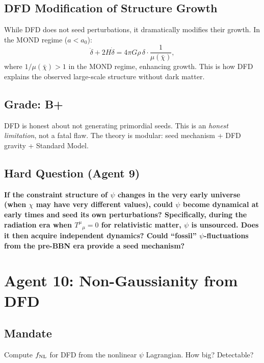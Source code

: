 \documentclass[11pt,a4paper]{article}
\begin{document}
\subsection{DFD Modification of Structure Growth}

While DFD does not seed perturbations, it dramatically modifies their growth. In the MOND regime ($a < a_0$):
\begin{equation}
\ddot\delta + 2H\dot\delta = 4\pi G\rho\,\delta\cdot\frac{1}{\mu(\bar\chi)},
\end{equation}
where $1/\mu(\bar\chi) > 1$ in the MOND regime, enhancing growth. This is how DFD explains the observed large-scale structure without dark matter.

\subsection{Grade: B+}

DFD is honest about not generating primordial seeds. This is an \emph{honest limitation}, not a fatal flaw. The theory is modular: seed mechanism + DFD gravity + Standard Model.

\subsection{Hard Question (Agent 9)}

\textbf{If the constraint structure of $\psi$ changes in the very early universe (when $\chi$ may have very different values), could $\psi$ become dynamical at early times and seed its own perturbations? Specifically, during the radiation era when $T^\mu{}_\mu = 0$ for relativistic matter, $\psi$ is unsourced. Does it then acquire independent dynamics? Could ``fossil'' $\psi$-fluctuations from the pre-BBN era provide a seed mechanism?}

\newpage

\section{Agent 10: Non-Gaussianity from DFD}
\label{sec:agent10}

\subsection{Mandate}

Compute $f_{\rm NL}$ for DFD from the nonlinear $\psi$ Lagrangian. How big? Detectable?
\end{document}
